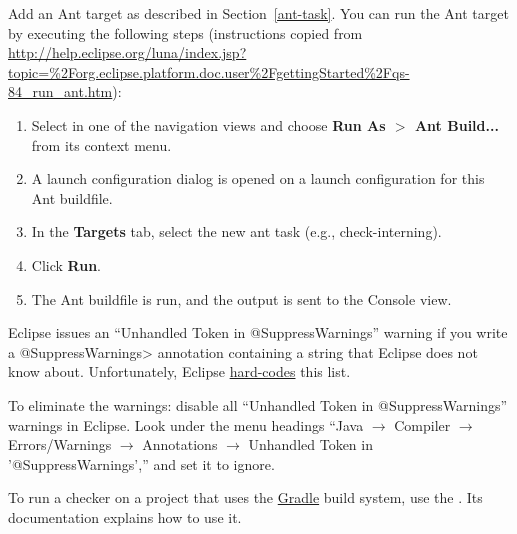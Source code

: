 
Add an Ant target as described in Section~\ref{ant-task}.  You can
run the Ant target by executing the following steps
(instructions copied from
{\codesize\url{http://help.eclipse.org/luna/index.jsp?topic=%2Forg.eclipse.platform.doc.user%2FgettingStarted%2Fqs-84_run_ant.htm}}):

\begin{enumerate}

\item
  Select  in one of the navigation views and choose
  {\bf Run As $>$ Ant Build...} from its context menu.

\item
  A launch configuration dialog is opened on a launch configuration
  for this Ant buildfile.

\item
  In the {\bf Targets} tab, select the new ant task (e.g., check-interning).

\item
  Click {\bf Run}.

\item
  The Ant buildfile is run, and the output is sent to the Console view.

\end{enumerate}



Eclipse issues an ``Unhandled Token in @SuppressWarnings'' warning if you
write a \<@SuppressWarnings> annotation containing a string that Eclipse does not
know about.  Unfortunately, Eclipse
\href{https://bugs.eclipse.org/bugs/show_bug.cgi?id=122475}{hard-codes}
this list.

To eliminate the warnings:
disable all ``Unhandled Token in @SuppressWarnings'' warnings in Eclipse.
Look under the menu headings
``Java $\rightarrow$ Compiler $\rightarrow$ Errors/Warnings $\rightarrow$
Annotations $\rightarrow$ Unhandled Token in '@SuppressWarnings',''
and set it to ignore.



To run a checker
on a project that uses the \href{https://gradle.org/}{Gradle} build system,
use the
.  Its documentation explains how to use it.



